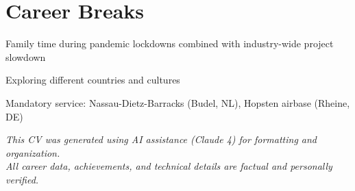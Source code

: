\documentclass[11pt,a4paper,sans]{moderncv}
\begin{document}
\section{Career Breaks}

{Family time during pandemic lockdowns combined with industry-wide project slowdown}

{Exploring different countries and cultures}

{Mandatory service: Nassau-Dietz-Barracks (Budel, NL), Hopsten airbase (Rheine, DE)}

\vspace{20pt}

\begin{center}
\footnotesize
\textit{This CV was generated using AI assistance (Claude 4) for formatting and organization.\\
All career data, achievements, and technical details are factual and personally verified.}
\end{center}
\end{document}
